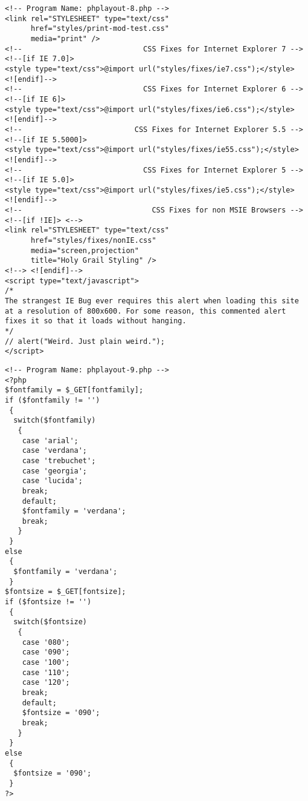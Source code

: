 \documentclass[12pt,a4paper,twosides,ngerman]{scrbook}
\begin{document}
\begin{center}
\begin{minipage}[t]{155mm}
\begin{lstlisting}[captionpos=b, caption=Layout - phplayout-8.php]
<!-- Program Name: phplayout-8.php -->
<link rel="STYLESHEET" type="text/css"
      href="styles/print-mod-test.css"
      media="print" />
<!--                            CSS Fixes for Internet Explorer 7 -->
<!--[if IE 7.0]>
<style type="text/css">@import url("styles/fixes/ie7.css");</style>
<![endif]-->
<!--                            CSS Fixes for Internet Explorer 6 -->
<!--[if IE 6]>
<style type="text/css">@import url("styles/fixes/ie6.css");</style>
<![endif]-->
<!--                          CSS Fixes for Internet Explorer 5.5 -->
<!--[if IE 5.5000]>
<style type="text/css">@import url("styles/fixes/ie55.css");</style>
<![endif]-->
<!--                            CSS Fixes for Internet Explorer 5 -->
<!--[if IE 5.0]>
<style type="text/css">@import url("styles/fixes/ie5.css");</style>
<![endif]-->
<!--                              CSS Fixes for non MSIE Browsers -->
<!--[if !IE]> <-->
<link rel="STYLESHEET" type="text/css"
      href="styles/fixes/nonIE.css"
      media="screen,projection"
      title="Holy Grail Styling" />
<!--> <![endif]-->
<script type="text/javascript">
/*
The strangest IE Bug ever requires this alert when loading this site
at a resolution of 800x600. For some reason, this commented alert
fixes it so that it loads without hanging.
*/
// alert("Weird. Just plain weird.");
</script>
\end{lstlisting}
\end{minipage}
\end{center} 

\begin{center}
\begin{minipage}[t]{155mm}
\begin{lstlisting}[captionpos=b, caption=Layout - phplayout-9.php]
<!-- Program Name: phplayout-9.php -->
<?php
$fontfamily = $_GET[fontfamily];
if ($fontfamily != '')
 {
  switch($fontfamily)
   {
    case 'arial';
    case 'verdana';
    case 'trebuchet';
    case 'georgia';
    case 'lucida';
    break;
    default;
    $fontfamily = 'verdana';
    break;
   }
 }
else
 {
  $fontfamily = 'verdana';
 }
$fontsize = $_GET[fontsize];
if ($fontsize != '')
 {
  switch($fontsize)
   {
    case '080';
    case '090';
    case '100';
    case '110';
    case '120';
    break;
    default;
    $fontsize = '090';
    break;
   }
 }
else
 {
  $fontsize = '090';
 }
?>
\end{lstlisting}
\end{minipage}
\end{center} 
\end{document}
